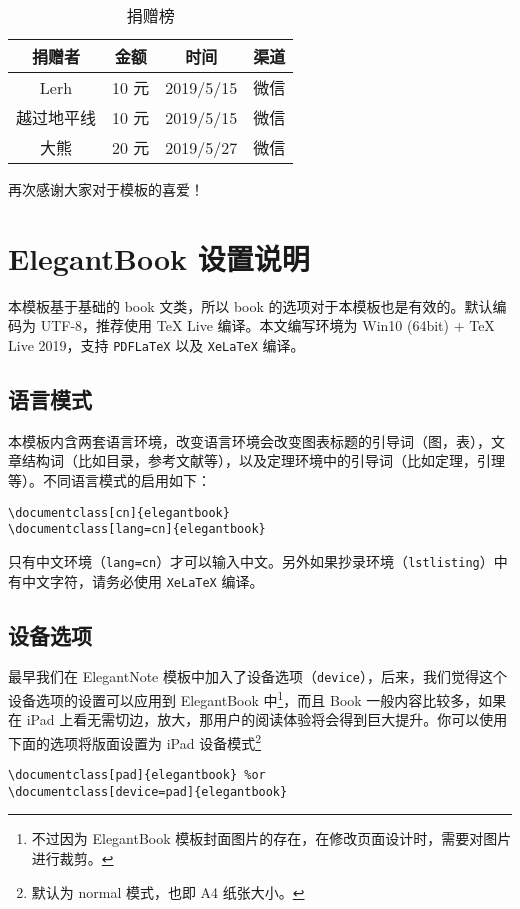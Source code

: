 \documentclass[cn,11pt]{elegantbook}
\begin{document}
\begin{table}[htbp]
  \centering
  \caption{捐赠榜}
    \begin{tabular}{cccc}
    \toprule
    捐赠者   & 金额 & 时间 & 渠道 \\
    \midrule
    Lerh  & 10 元  & 2019/5/15 & 微信 \\
    越过地平线 & 10 元    & 2019/5/15 & 微信 \\
	大熊 &  20 元 & 2019/5/27 & 微信 \\
    \bottomrule
    \end{tabular}%
\end{table}%

再次感谢大家对于模板的喜爱！

\chapter{ElegantBook 设置说明}

本模板基于基础的 book 文类，所以 book 的选项对于本模板也是有效的。默认编码为 UTF-8，推荐使用 \TeX{} Live 编译。本文编写环境为 Win10 (64bit) + \TeX{} Live 2019，支持 \lstinline{PDFLaTeX} 以及 \lstinline{XeLaTeX} 编译。


\section{语言模式}
本模板内含两套语言环境，改变语言环境会改变图表标题的引导词（图，表），文章结构词（比如目录，参考文献等），以及定理环境中的引导词（比如定理，引理等）。不同语言模式的启用如下：
\begin{lstlisting}
\documentclass[cn]{elegantbook} 
\documentclass[lang=cn]{elegantbook}
\end{lstlisting}

\begin{remark}
只有中文环境（\lstinline{lang=cn}）才可以输入中文。另外如果抄录环境（\lstinline{lstlisting}）中有中文字符，请务必使用 \lstinline{XeLaTeX} 编译。
\end{remark}

\section{设备选项}
最早我们在 ElegantNote 模板中加入了设备选项（\lstinline{device}），后来，我们觉得这个设备选项的设置可以应用到 ElegantBook 中\footnote{不过因为 ElegantBook 模板封面图片的存在，在修改页面设计时，需要对图片进行裁剪。}，而且 Book 一般内容比较多，如果在 iPad 上看无需切边，放大，那用户的阅读体验将会得到巨大提升。你可以使用下面的选项将版面设置为 iPad 设备模式\footnote{默认为 normal 模式，也即 A4 纸张大小。}
\begin{lstlisting}
\documentclass[pad]{elegantbook} %or
\documentclass[device=pad]{elegantbook}
\end{lstlisting}
\end{document}
